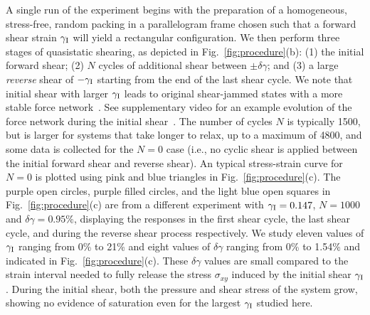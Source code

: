 \documentclass[twocolumn,showkeys,superscriptaddress,preprintnumbers,amsmath,amssymb,showpacs,prx,longbibliography]{revtex4-2}
\begin{document}
\begin{CJK*}{UTF8}{gbsn}
A single run of the experiment begins with the preparation of a homogeneous, stress-free, random packing in a parallelogram frame chosen such that a forward shear strain $\gamma_{\rm I}$ will yield a rectangular configuration. We then perform three stages of quasistatic shearing, as depicted in Fig.~\ref{fig:procedure}(b): (1) the initial forward shear; (2) $N$ cycles of additional shear between $\pm \delta\gamma$; and (3) a large {\it reverse} shear of 
\textcolor{black}{$-\gamma_{\rm I}$} starting from the end of the last shear cycle. 
{\color{black} We note that initial shear with larger $\gamma_{\rm I}$ leads to original shear-jammed states with a more stable force network~\cite{Bi2011_nat,sarkar2013_prl,sarkar2015_pre,sarkar2016_pre,dong2018_prl,zhao2019_prl}. See supplementary video for an example evolution of the force network during the initial shear~\cite{Note1}.}
The number of cycles $N$ is typically 1500, but is larger for systems that take longer to relax, up to a maximum of 4800, and some data is collected for the $N=0$ case (i.e., no cyclic shear is applied between the initial forward shear and reverse shear). An typical stress-strain curve for $N=0$ is plotted 
{\color{black} using pink and blue triangles} in Fig.~\ref{fig:procedure}(c). The purple open circles, purple filled circles, and the light blue open squares in Fig.~\ref{fig:procedure}(c) are from a different experiment with $\gamma_{\rm I}=0.147$, $N = 1000$ and $\delta\gamma=0.95\%$, displaying the responses in the first shear cycle, the last shear cycle, and during the reverse shear process respectively. We study eleven values of $\gamma_{\rm I}$ ranging from 0\% to 21\% and eight values of $\delta\gamma$ ranging from 0\% to 1.54\% and indicated in Fig.~\ref{fig:procedure}(c).  These $\delta\gamma$ values are small compared to the strain interval needed to fully release the stress $\sigma_{xy}$ induced by the initial shear $\gamma_{\rm I}$. During the initial shear, both the pressure and shear stress of the system grow, showing no evidence of saturation even for the largest $\gamma_{\rm I}$ studied here. 


\end{CJK*}
\end{document}
